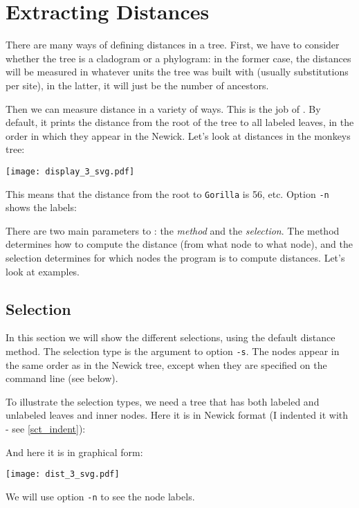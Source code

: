 \section{Extracting Distances}

There are many ways of defining distances in a tree. First, we have to consider
whether the tree is a cladogram or a phylogram: in the former case, the
distances will be measured in whatever units the tree was built with (usually
substitutions per site), in the latter, it will just be the number of ancestors.

Then we can measure distance in a variety of ways. This is the job of
\distance. By default, it prints the distance from the root of the tree to all
labeled leaves, in the order in which they appear in the Newick. Let's look at
distances in the monkeys tree:

\begin{center}
\texttt{[image: display\_3\_svg.pdf]}
\end{center}


\begin{samepage}

\end{samepage}
This means that the distance from the root to \texttt{Gorilla} is 56, etc. Option \texttt{-n} shows the labels:

\begin{samepage}

\end{samepage}

There are two main parameters to \distance: the \emph{method} and the
\emph{selection}. The method determines how to compute the distance (from what
node to what node), and the selection determines for which nodes the program is
to compute distances. Let's look at examples.

\subsection{Selection}

In this section we will show the different selections, using the default
distance method. The selection type is the argument to option \texttt{-s}.
The nodes appear in the same order as in the Newick tree, except when they are
specified on the command line (see below).

To illustrate the selection types, we need a tree that has both labeled and
unlabeled leaves and inner nodes. Here it is in Newick format (I indented it
with \nwindent{} - see \ref{sct_indent}):

And here it is in graphical form:
\begin{center}
\texttt{[image: dist\_3\_svg.pdf]}
\end{center}
We will use option \texttt{-n} to see the node labels.

